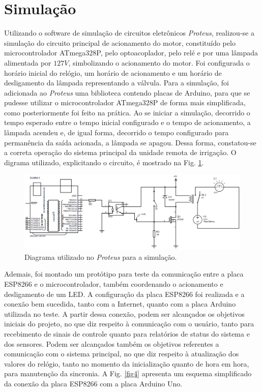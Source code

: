 \documentclass[conference]{IEEEtran}
\begin{document}
\section{Simulação}

Utilizando o software de simulação de circuitos eletrônicos \textit{Proteus}, realizou-se a simulação do circuito principal de acionamento do motor, constituído pelo microcontrolador ATmega328P, pelo optoacoplador, pelo relé e por uma lâmpada alimentada por $127 V$, simbolizando o acionamento do motor. Foi configurada o horário inicial do relógio, um horário de acionamento e um horário de desligamento da lâmpada representando a válvula. Para a simulação, foi adicionada ao \textit{Proteus} uma biblioteca contendo placas de Arduino, para que se pudesse utilizar o microcontrolador ATmega328P de forma mais simplificada, como posteriormente foi feito na prática. Ao se iniciar a simulação, decorrido o tempo esperado entre o tempo inicial configurado e o tempo de acionamento, a lâmpada acendeu e, de igual forma, decorrido o tempo configurado para permanência da saída acionada, a lâmpada se apagou. Dessa forma, constatou-se a correta operação do sistema principal da unidade remota de irrigação. O digrama utilizado, explicitando o circuito, é mostrado na Fig. \ref{fig3}.

\begin{figure}[htbp]
\centerline{\includegraphics[angle=0, scale=.2]{images/Img3.png}}
\caption{Diagrama utilizado no \textit{Proteus} para a simulação.}
\label{fig3}
\end{figure}

Ademais, foi montado um protótipo para teste da comunicação entre a placa ESP8266 e o microcontrolador, também coordenando o acionamento e desligamento de um LED. A configuração da placa ESP8266 foi realizada e a conexão bem sucedida, tanto com a Internet, quanto com a placa Arduino utilizada no teste. A partir dessa conexão, podem ser alcançados os objetivos iniciais do projeto, no que diz respeito à comunicação com o usuário, tanto para recebimento de sinais de controle quanto para relatórios de status do sistema e dos sensores. Podem ser alcançados também os objetivos referentes a comunicação com o sistema principal, no que diz respeito à atualização dos valores do relógio, tanto no momento da inicialização quanto de hora em hora, para manutenção da sincronia. A Fig. \ref{fig4} apresenta um esquema simplificado da conexão da placa ESP8266 com a placa Arduino Uno.
\end{document}
